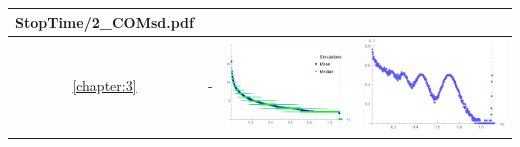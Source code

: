 \begin{table}[!htb]
\begin{tabular}{c|c|c|c}
\begin{minipage}{.4\textwidth}
			{StopTime/2_COMsd.pdf}
		\end{minipage}   
	 \\ \hline
		\ref{chapter:3} & - &
		\begin{minipage}{.4\textwidth}
			\includegraphics[width=\linewidth]
			{StopTime/3_BMtau1.pdf}
		\end{minipage}
		& \begin{minipage}{.4\textwidth}
			\includegraphics[width=\linewidth]
			{StopTime/3_BMsd.pdf}
		\end{minipage}    
	\end{tabular}
\label{tab1}
\end{table}
